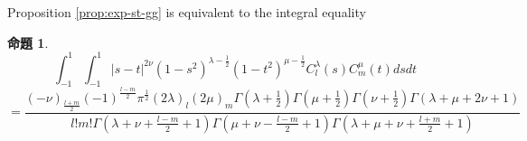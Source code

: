 \documentclass[pdf,notes]{beamer}
\newtheorem{prop}{命題}
\begin{document}
\begin{frame}
	Proposition \ref{prop:exp-st-gg} is equivalent to the integral equality
	\begin{prop}
		\label{prop:int-st-gg}
		\begin{equation*}
			\int_{- 1}^1 \int_{- 1}^1 | s - t |^{2 \nu} (1 - s^2)^{\lambda - \frac{1}{2}}
			(1 - t^2)^{\mu - \frac{1}{2}} C_l^{\lambda} (s) C_m^{\mu} (t) d s d t
		\end{equation*}
		{\scriptsize
		\begin{equation}
			=\frac{(- \nu)_{\frac{l + m}{2}} (- 1)^{\frac{l - m}{2}} \pi^{\frac{1}{2}} (2
			\lambda)_l (2 \mu)_m \Gamma \left( \lambda + \frac{1}{2} \right) \Gamma \left(
			\mu + \frac{1}{2} \right) \Gamma \left( \nu + \frac{1}{2} \right) \Gamma
		(\lambda + \mu + 2 \nu + 1)}{l!m! \Gamma \left( \lambda + \nu + \frac{l -
		m}{2} + 1 \right) \Gamma \left( \mu + \nu - \frac{l - m}{2} + 1 \right) \Gamma
		\left( \lambda + \mu + \nu + \frac{l + m}{2} + 1 \right)}
			\label{eqn:int-st-gg}
			\tag{1$'$}
		\end{equation}
		}
	\end{prop}
\end{frame}
\end{document}
